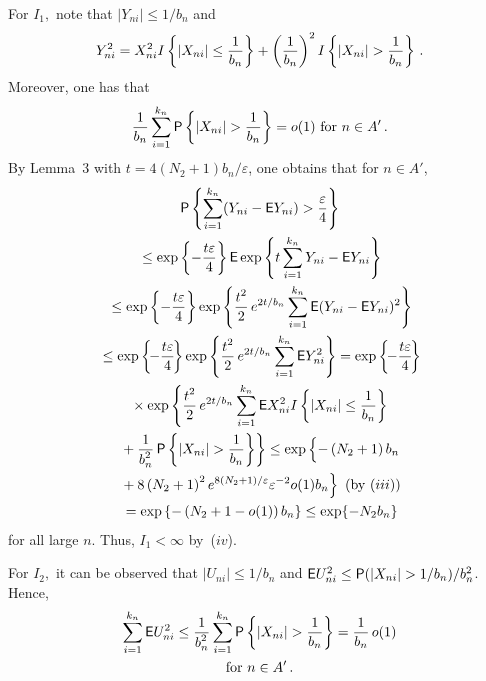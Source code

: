 \begin{multicols}{2}
For $I_1,$ note that $|Y_{ni}|\le 1/b_n$ and
$$
Y_{ni}^2=X_{ni}^2I\left\{|X_{ni}|\le \fr{1}{b_n} \right\}+\left(\fr{1}{b_n}\right)^2 
I\left\{|X_{ni}|>\fr{1}{b_n}\right\}\,.
$$
Moreover, one has that
$$ 
\fr{1}{b_n} \sum\limits_{i=1}^{k_n} {\sf P}\left\{|X_{ni}|>\fr{1}{b_n}\right \}=o(1) \mbox{ for } n\in A'\,. 
$$
By Lemma~3 with $t=4(N_2+1)b_n/\varepsilon$,  one obtains that for $n\in A'$,
\begin{multline*}
{\sf P}\left\{\sum\limits_{i=1}^{k_n} (Y_{ni}- {\sf E}Y_{ni})>\fr{\varepsilon}{4}\right\}\\
{}\le \exp\left\{-\fr{t\varepsilon}{4}\right\} {\sf E} \exp\left\{t\sum\limits_{i=1}^{k_n} Y_{ni}-{\sf E}Y_{ni}\right\} \\
{}\le \exp\left\{-\fr{t\varepsilon}{4}\right\} \exp\left\{\fr{t^2}{2}\,e^{2t/b_n}
\sum\limits_{i=1}^{k_n} {\sf E}(Y_{ni}-{\sf E}Y_{ni})^2 \right\}\\
{}\le \exp\left\{\!-\fr{t\varepsilon}{4}\!\right\} 
\exp\left\{\fr{t^2}{2}\, e^{2t/b_n}\sum\limits_{i=1}^{k_n} {\sf E}Y_{ni}^2 \right\}
=  \exp\left\{\!
-\fr{t\varepsilon}{4}\!\right\} \\
{}\times \exp\left\{\fr{t^2}{2}\, e^{2t/b_n}\sum\limits_{i=1}^{k_n}
{\sf E}X_{ni}^2I\left\{|X_{ni}|\le \fr{1}{b_n} \right\}\right.\\
\left.{} + \fr{1}{b_n^2} \,{\sf P}\left\{
\left|X_{ni}\right|>\fr{1}{b_n}\right\} \right\}
\le 
\exp\left\{-\vphantom{8\left(N_2 +1\right)^2 e^{8(N_2+1)/\varepsilon}}
\left(N_2+1\right)b_n\right.\\
\left.{}+ {8\left(N_2 +1\right)^2 e^{8(N_2+1)/\varepsilon}}{\varepsilon^{-2}}
o(1)b_n\right\} \mbox{ (by~($iii$))}\\
{}=\exp\left\{-\left(N_2+1 - o(1)\right)b_n \right\} 
\le \exp\{-N_2 b_n\}
\end{multline*}
for all large $n$. Thus, $I_1<\infty$ by~($iv$).

For $I_2,$ it can be observed that $|U_{ni}|\le 1/b_n$ and  ${\sf E}U_{ni}^2\le 
{\sf P}(|X_{ni}|>1/b_n)/b^2_n$. Hence,
\begin{multline*}
\sum\limits_{i=1}^{k_n} {\sf E} U_{ni}^2\le \fr{1}{b^2_n} 
\sum\limits_{i=1}^{k_n} {\sf P}\left\{|X_{ni}|>\fr{1}{b_n}\right\}=\fr{1}{b_n}\, o(1)\\
 \mbox{for } n\in  A'\,. 
\end{multline*}


\end{multicols}
